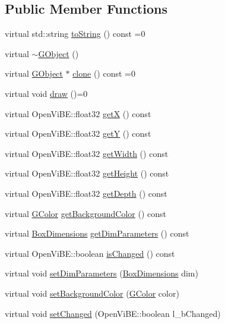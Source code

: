 \subsection*{Public Member Functions}
\begin{DoxyCompactItemize}
\item 
virtual std::string \hyperlink{classOpenViBEApplications_1_1GObject_a4b50dbc5c1db8346461892dcdd53db86}{toString} () const =0
\item 
virtual \hyperlink{classOpenViBEApplications_1_1GObject_a8315726c820a2ffbfbfe9ca99c479a53}{$\sim$GObject} ()
\item 
virtual \hyperlink{classOpenViBEApplications_1_1GObject}{GObject} $\ast$ \hyperlink{classOpenViBEApplications_1_1GObject_a47a74b8b3ce8781c4d54fbf872e205e3}{clone} () const =0
\item 
virtual void \hyperlink{classOpenViBEApplications_1_1GObject_a00e373a12688223086a334eae0436332}{draw} ()=0
\item 
virtual OpenViBE::float32 \hyperlink{classOpenViBEApplications_1_1GObject_a66cdc79c840662484c654cb8cc4902be}{getX} () const 
\item 
virtual OpenViBE::float32 \hyperlink{classOpenViBEApplications_1_1GObject_a782b023c593106c8bab1a0559ea28ace}{getY} () const 
\item 
virtual OpenViBE::float32 \hyperlink{classOpenViBEApplications_1_1GObject_a8c9b41215da003cf213155d6334ca477}{getWidth} () const 
\item 
virtual OpenViBE::float32 \hyperlink{classOpenViBEApplications_1_1GObject_a122581bc28e3a30903749c6695c623bb}{getHeight} () const 
\item 
virtual OpenViBE::float32 \hyperlink{classOpenViBEApplications_1_1GObject_ad9e30c48ca675b9b25c43d18bbaefb07}{getDepth} () const 
\item 
virtual \hyperlink{structOpenViBEApplications_1_1GColor}{GColor} \hyperlink{classOpenViBEApplications_1_1GObject_a2e6ff1bdb7c64ee381b08f5b1f3cc145}{getBackgroundColor} () const 
\item 
virtual \hyperlink{structOpenViBEApplications_1_1__BoxDimensions}{BoxDimensions} \hyperlink{classOpenViBEApplications_1_1GObject_a1d6104900107fa988cf36c113937a328}{getDimParameters} () const 
\item 
virtual OpenViBE::boolean \hyperlink{classOpenViBEApplications_1_1GObject_a0582fbfa50cbb3913ffa0a156bcd5bc8}{isChanged} () const 
\item 
virtual void \hyperlink{classOpenViBEApplications_1_1GObject_a6142ac58568e334e50c3eae060590f82}{setDimParameters} (\hyperlink{structOpenViBEApplications_1_1__BoxDimensions}{BoxDimensions} dim)
\item 
virtual void \hyperlink{classOpenViBEApplications_1_1GObject_acab35da772fa8e50d44815759852febd}{setBackgroundColor} (\hyperlink{structOpenViBEApplications_1_1GColor}{GColor} color)
\item 
virtual void \hyperlink{classOpenViBEApplications_1_1GObject_a2c9e566e5d5e9a9975f9f6efb79efea8}{setChanged} (OpenViBE::boolean l\_\-bChanged)
\end{DoxyCompactItemize}
